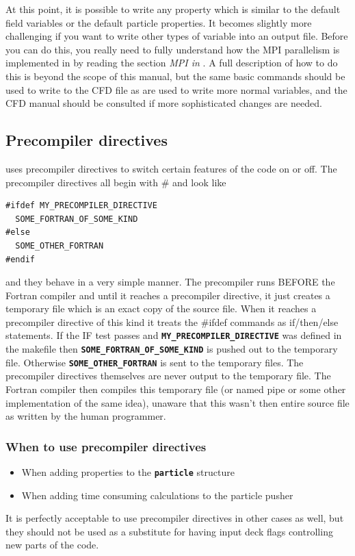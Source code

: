 \documentclass[12pt,a4paper]{article}
\newcommand{\simpleboxverbatim}{\begin{Verbatim}[obeytabs=true,frame=single,
  framerule=0.5mm,rulecolor=\color{warwickmid},formatcom=\color{black}]}
\newcommand{\inlinecode}[1]{{\color{warwickred} \bf\texttt{#1}}}
\newcommand{\EPOCH}{{\color{warwickdark}\fontfamily{phv}\selectfont{EPOCH}}}
\begin{document}
At this point, it is possible to write any property which is similar to the
default field variables or the default particle properties. It becomes slightly
more challenging if you want to write other types of variable into an output
file. Before you can do this, you really need to fully understand how the MPI
parallelism is implemented in {\EPOCH} by reading the section {\it MPI in
{\EPOCH}}. A full description of how to do this is beyond the scope of this
manual, but the same basic commands should be used to write to the CFD file as
are used to write more normal variables, and the CFD manual should be consulted
if more sophisticated changes are needed.

\pagebreak

\subsection{Precompiler directives}
{\EPOCH} uses precompiler directives to switch certain features of the code on or
off. The precompiler directives all begin with \# and look like
\simpleboxverbatim
#ifdef MY_PRECOMPILER_DIRECTIVE
  SOME_FORTRAN_OF_SOME_KIND
#else
  SOME_OTHER_FORTRAN
#endif
\end{Verbatim}
and they behave in a very simple manner. The precompiler runs BEFORE the
Fortran compiler and until it reaches a precompiler directive, it just creates
a temporary file which is an exact copy of the source file. When it reaches a
precompiler directive of this kind it treats the \#ifdef commands as
if/then/else statements. If the IF test passes and
\inlinecode{MY\_PRECOMPILER\_DIRECTIVE} was defined in the makefile then
\inlinecode{SOME\_FORTRAN\_OF\_SOME\_KIND} is pushed out to the temporary
file. Otherwise \inlinecode{SOME\_OTHER\_FORTRAN} is sent to the temporary
files. The precompiler directives themselves are never output to the temporary
file. The Fortran compiler then compiles this temporary file (or named pipe or
some other implementation of the same idea), unaware that this wasn't then
entire source file as written by the human programmer.

\subsubsection{When to use precompiler directives}
\begin{itemize}
\item When adding properties to the \inlinecode{particle} structure
\item When adding time consuming calculations to the particle pusher
\end{itemize}
It is perfectly acceptable to use precompiler directives in other cases as
well, but they should not be used as a substitute for having input deck flags
controlling new parts of the code.
\end{document}
